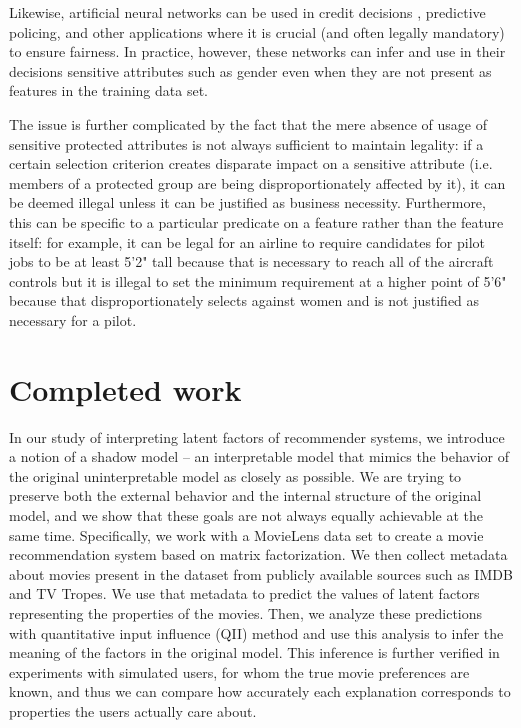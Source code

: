 Likewise, artificial neural networks can be used in credit decisions
\cite{WEST20001131}, predictive policing\cite{Seo2018PartiallyGN}, and other
applications where it is crucial (and often legally mandatory) to ensure
fairness. In practice, however, these networks can infer and use in their
decisions sensitive attributes such as gender even when they are not present
as features in the training data set\cite{Beutel2017DataDA}.

The issue is further complicated by the fact that the mere absence of usage of
sensitive protected attributes is not always sufficient to maintain legality:
if a certain selection criterion creates disparate impact on a sensitive
attribute (i.e. members of a protected group are being disproportionately
affected by it), it can be deemed illegal unless it can be justified as business
necessity. Furthermore, this can be specific to a particular predicate on a
feature rather than the feature itself: for example, it can be legal for an
airline to require candidates for pilot jobs to be at least 5'2" tall because
that is necessary to reach all of the aircraft controls but it is illegal to
set the minimum requirement at a higher point of 5'6" because that
disproportionately selects against women and is not justified as necessary
for a pilot\cite{RoseMaryCourtCase}.

\section{Completed work}

In our study of interpreting latent factors of recommender systems, we introduce
a notion of a shadow model -- an interpretable model that mimics the behavior
of the original uninterpretable model as closely as possible. We are trying to
preserve both the external behavior and the internal structure of the original
model, and we show that these goals are not always equally achievable at the
same time. Specifically, we work with a MovieLens data set to create a
movie recommendation system based on matrix factorization. We then collect
metadata about movies present in the dataset from publicly available sources
such as IMDB and TV Tropes. We use that metadata to predict the values of latent
factors representing the properties of the movies. Then, we analyze these
predictions with quantitative input influence (QII) method
\cite{datta2016algorithmic} and use this analysis to infer the meaning of the
factors in the original model. This inference is further verified in experiments
with simulated users, for whom the true movie preferences are known, and thus
we can compare how accurately each explanation corresponds to properties the
users actually care about.

